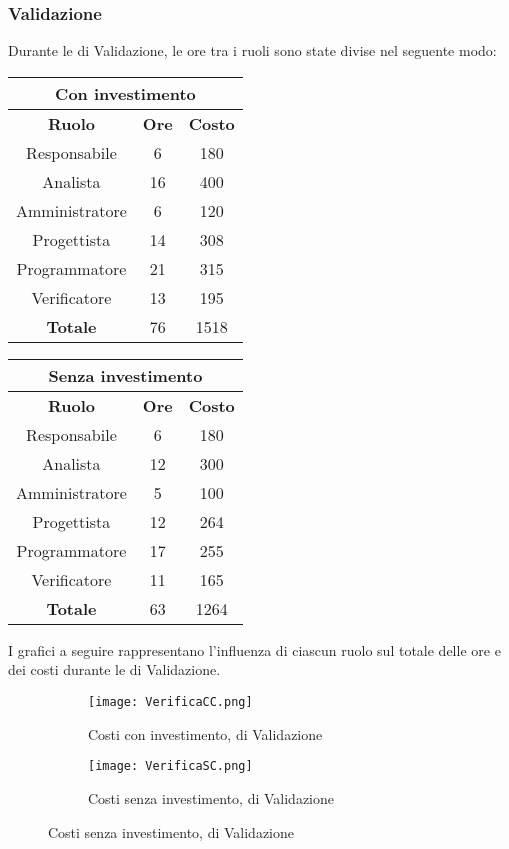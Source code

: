 \documentclass{scalatekids-article}
\begin{document}
\subsubsection{Validazione}
Durante le  di Validazione, le ore tra i ruoli sono state divise nel seguente modo:
\begin{center}
  \normalsize
  \begin{tabular}{| c | c | c |}
    \hline
    \multicolumn{3}{|c|}{\textbf{Con investimento}}\\
    \hline
    \textbf{Ruolo} & \textbf{Ore} & \textbf{Costo}\\
    \hline
    Responsabile & 6 & 180 \\
    Analista & 16 & 400\\
    Amministratore & 6 & 120\\
    Progettista & 14 & 308\\
    Programmatore & 21 & 315\\
    Verificatore & 13 & 195\\
    \hline
    \textbf{Totale} & 76 & 1518\\
    \hline
  \end{tabular}
  \qquad
  \begin{tabular}{| c | c | c |}
    \hline
    \multicolumn{3}{|c|}{\textbf{Senza investimento}}\\
    \hline
    \textbf{Ruolo} & \textbf{Ore} & \textbf{Costo}\\
    \hline
    Responsabile & 6 & 180\\
    Analista & 12 & 300\\
    Amministratore & 5 & 100\\
    Progettista & 12 & 264\\
    Programmatore & 17 & 255\\
    Verificatore & 11 & 165\\
    \hline
    \textbf{Totale} & 63 & 1264\\
    \hline
  \end{tabular}
\end{center}
I grafici a seguire rappresentano l'influenza di ciascun ruolo sul totale delle ore e dei costi durante le  di Validazione.
\begin{figure}[H]
  \begin{subfigure}[H]{0.47\textwidth}
    \texttt{[image: VerificaCC.png]}
    \caption{Costi con investimento,  di Validazione}
  \end{subfigure}
  \qquad
  \begin{subfigure}[H]{0.47\textwidth}
    \texttt{[image: VerificaSC.png]}
    \caption{Costi senza investimento,  di Validazione}
  \end{subfigure}
\end{figure}
\newpage
\end{document}
